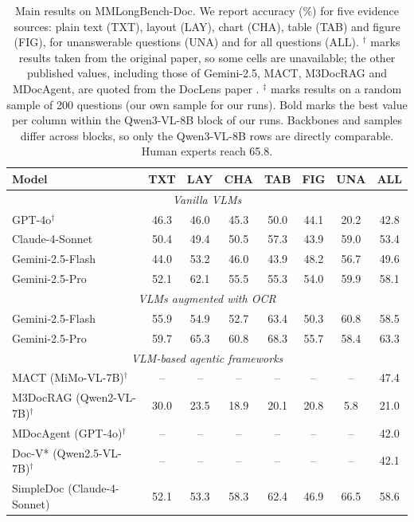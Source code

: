 \begin{table}[t]
\caption{Main results on MMLongBench-Doc. We report accuracy (\%) for five evidence sources: plain text (TXT), layout (LAY), chart (CHA), table (TAB) and figure (FIG), for unanswerable questions (UNA) and for all questions (ALL). $^\dagger$ marks results taken from the original paper, so some cells are unavailable; the other published values, including those of Gemini-2.5, MACT, M3DocRAG and MDocAgent, are quoted from the DocLens paper \cite{zhu2025doclens}. $^\ddagger$ marks results on a random sample of 200 questions (our own sample for our runs). Bold marks the best value per column within the Qwen3-VL-8B block of our runs. Backbones and samples differ across blocks, so only the Qwen3-VL-8B rows are directly comparable. Human experts reach 65.8.}
\label{tab:main}
\centering
\footnotesize
\setlength{\tabcolsep}{4.5pt}
\begin{tabular}{@{}lccccccc@{}}
\toprule
Model & TXT & LAY & CHA & TAB & FIG & UNA & ALL \\
\midrule
\multicolumn{8}{c}{\textit{Vanilla VLMs}} \\
GPT-4o$^\dagger$ \cite{ma2024mmlongbench} & 46.3 & 46.0 & 45.3 & 50.0 & 44.1 & 20.2 & 42.8 \\
Claude-4-Sonnet & 50.4 & 49.4 & 50.5 & 57.3 & 43.9 & 59.0 & 53.4 \\
Gemini-2.5-Flash & 44.0 & 53.2 & 46.0 & 43.9 & 48.2 & 56.7 & 49.6 \\
Gemini-2.5-Pro & 52.1 & 62.1 & 55.5 & 55.3 & 54.0 & 59.9 & 58.1 \\
\midrule
\multicolumn{8}{c}{\textit{VLMs augmented with OCR}} \\
Gemini-2.5-Flash & 55.9 & 54.9 & 52.7 & 63.4 & 50.3 & 60.8 & 58.5 \\
Gemini-2.5-Pro & 59.7 & 65.3 & 60.8 & 68.3 & 55.7 & 58.4 & 63.3 \\
\midrule
\multicolumn{8}{c}{\textit{VLM-based agentic frameworks}} \\
MACT (MiMo-VL-7B)$^\dagger$ & -- & -- & -- & -- & -- & -- & 47.4 \\
M3DocRAG (Qwen2-VL-7B)$^\dagger$ & 30.0 & 23.5 & 18.9 & 20.1 & 20.8 & 5.8 & 21.0 \\
MDocAgent (GPT-4o)$^\dagger$ & -- & -- & -- & -- & -- & -- & 42.0 \\
Doc-V* (Qwen2.5-VL-7B)$^\dagger$ \cite{docvstar} & -- & -- & -- & -- & -- & -- & 42.1 \\
SimpleDoc (Claude-4-Sonnet) \cite{jain2025simpledoc} & 52.1 & 53.3 & 58.3 & 62.4 & 46.9 & 66.5 & 58.6 \\

\end{tabular}
\end{table}
